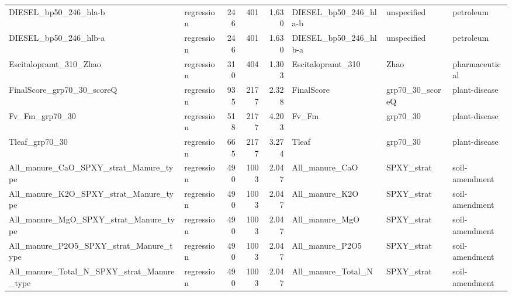 \begin{landscape}
\begin{longtable}{L{6.2cm}L{2.1cm}rrrL{6.0cm}L{2.6cm}L{3.0cm}}
DIESEL\_\allowbreak{}bp50\_\allowbreak{}246\_\allowbreak{}hla-\allowbreak{}b & regression & 246 & 401 & 1.630 & DIESEL\_\allowbreak{}bp50\_\allowbreak{}246\_\allowbreak{}hla-\allowbreak{}b & unspecified & petroleum \\
DIESEL\_\allowbreak{}bp50\_\allowbreak{}246\_\allowbreak{}hlb-\allowbreak{}a & regression & 246 & 401 & 1.630 & DIESEL\_\allowbreak{}bp50\_\allowbreak{}246\_\allowbreak{}hlb-\allowbreak{}a & unspecified & petroleum \\
Escitalopramt\_\allowbreak{}310\_\allowbreak{}Zhao & regression & 310 & 404 & 1.303 & Escitalopramt\_\allowbreak{}310 & Zhao & pharmaceutical \\
FinalScore\_\allowbreak{}grp70\_\allowbreak{}30\_\allowbreak{}scoreQ & regression & 935 & 2177 & 2.328 & FinalScore & grp70\_\allowbreak{}30\_\allowbreak{}scoreQ & plant-\allowbreak{}disease \\
Fv\_\allowbreak{}Fm\_\allowbreak{}grp70\_\allowbreak{}30 & regression & 518 & 2177 & 4.203 & Fv\_\allowbreak{}Fm & grp70\_\allowbreak{}30 & plant-\allowbreak{}disease \\
Tleaf\_\allowbreak{}grp70\_\allowbreak{}30 & regression & 665 & 2177 & 3.274 & Tleaf & grp70\_\allowbreak{}30 & plant-\allowbreak{}disease \\
All\_\allowbreak{}manure\_\allowbreak{}CaO\_\allowbreak{}SPXY\_\allowbreak{}strat\_\allowbreak{}Manure\_\allowbreak{}type & regression & 490 & 1003 & 2.047 & All\_\allowbreak{}manure\_\allowbreak{}CaO & SPXY\_\allowbreak{}strat & soil-\allowbreak{}amendment \\
All\_\allowbreak{}manure\_\allowbreak{}K2O\_\allowbreak{}SPXY\_\allowbreak{}strat\_\allowbreak{}Manure\_\allowbreak{}type & regression & 490 & 1003 & 2.047 & All\_\allowbreak{}manure\_\allowbreak{}K2O & SPXY\_\allowbreak{}strat & soil-\allowbreak{}amendment \\
All\_\allowbreak{}manure\_\allowbreak{}MgO\_\allowbreak{}SPXY\_\allowbreak{}strat\_\allowbreak{}Manure\_\allowbreak{}type & regression & 490 & 1003 & 2.047 & All\_\allowbreak{}manure\_\allowbreak{}MgO & SPXY\_\allowbreak{}strat & soil-\allowbreak{}amendment \\
All\_\allowbreak{}manure\_\allowbreak{}P2O5\_\allowbreak{}SPXY\_\allowbreak{}strat\_\allowbreak{}Manure\_\allowbreak{}type & regression & 490 & 1003 & 2.047 & All\_\allowbreak{}manure\_\allowbreak{}P2O5 & SPXY\_\allowbreak{}strat & soil-\allowbreak{}amendment \\
All\_\allowbreak{}manure\_\allowbreak{}Total\_\allowbreak{}N\_\allowbreak{}SPXY\_\allowbreak{}strat\_\allowbreak{}Manure\_\allowbreak{}type & regression & 490 & 1003 & 2.047 & All\_\allowbreak{}manure\_\allowbreak{}Total\_\allowbreak{}N & SPXY\_\allowbreak{}strat & soil-\allowbreak{}amendment \\

\end{longtable}
\end{landscape}
